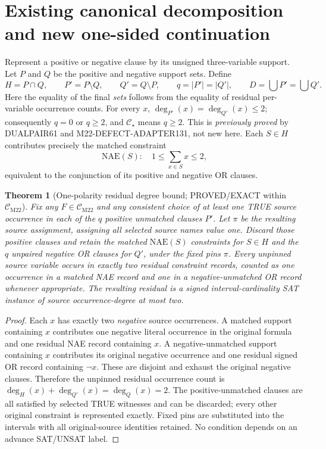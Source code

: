 \documentclass[11pt]{article}
\newtheorem{theorem}{Theorem}
\newcommand{\CM}{\mathcal C_{\mathrm{M22}}}
\newcommand{\CS}{\mathcal C_{\star}}
\begin{document}
\section{Existing canonical decomposition and new one-sided continuation}
Represent a positive or negative clause by its unsigned three-variable support. Let $P$ and $Q$ be the positive and negative support sets. Define
\[
H=P\cap Q,\qquad P'=P\setminus Q,\qquad Q'=Q\setminus P,\qquad
q=|P'|=|Q'|,\qquad D=\bigcup P'=\bigcup Q'.
\]
Here the equality of the final \emph{sets} follows from the equality of residual per-variable occurrence counts. For every $x$, $\deg_{P'}(x)=\deg_{Q'}(x)\le2$; consequently $q=0$ or $q\ge2$, and $\CS$ means $q\ge2$. This is \emph{previously proved} by DUALPAIR61 and M22-DEFECT-ADAPTER131, not new here. Each $S\in H$ contributes precisely the matched constraint
\[
\mathrm{NAE}(S):\quad1\le\sum_{x\in S}x\le2,
\]
equivalent to the conjunction of its positive and negative OR clauses.

\begin{theorem}[One-polarity residual degree bound; PROVED/EXACT within $\CM$]
Fix any $F\in\CM$ and any consistent choice of at least one TRUE source occurrence in \emph{each} of the $q$ positive unmatched clauses $P'$. Let $\pi$ be the resulting source assignment, assigning all selected source names value one. Discard those positive clauses and retain the matched $\mathrm{NAE}(S)$ constraints for $S\in H$ and the $q$ unpaired negative OR clauses for $Q'$, under the fixed pins $\pi$. Every unpinned source variable occurs in \emph{exactly two} residual constraint records, counted as one occurrence in a matched NAE record and one in a negative-unmatched OR record whenever appropriate. The resulting residual is a signed interval-cardinality SAT instance of source occurrence-degree at most two.
\end{theorem}
\begin{proof}
Each $x$ has exactly two \emph{negative} source occurrences. A matched support containing $x$ contributes one negative literal occurrence in the original formula and one residual NAE record containing $x$. A negative-unmatched support containing $x$ contributes its original negative occurrence and one residual signed OR record containing $\neg x$. These are disjoint and exhaust the original negative clauses. Therefore the unpinned residual occurrence count is $\deg_H(x)+\deg_{Q'}(x)=\deg_Q(x)=2$. The positive-unmatched clauses are all satisfied by selected TRUE witnesses and can be discarded; every other original constraint is represented exactly. Fixed pins are substituted into the intervals with all original-source identities retained. No condition depends on an advance SAT/UNSAT label.
\end{proof}
\end{document}
